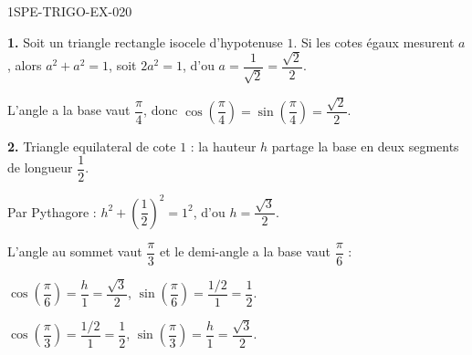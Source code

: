 \begin{corrige}{1SPE-TRIGO-EX-020}

\textbf{1.} Soit un triangle rectangle isocele d'hypotenuse $1$. Si les cotes égaux mesurent $a$, alors $a^2 + a^2 = 1$, soit $2a^2 = 1$, d'ou $a = \dfrac{1}{\sqrt{2}} = \dfrac{\sqrt{2}}{2}$.

L'angle a la base vaut $\dfrac{\pi}{4}$, donc $\cos\!\left(\dfrac{\pi}{4}\right) = \sin\!\left(\dfrac{\pi}{4}\right) = \dfrac{\sqrt{2}}{2}$.

\textbf{2.} Triangle equilateral de cote $1$ : la hauteur $h$ partage la base en deux segments de longueur $\dfrac{1}{2}$.

Par Pythagore : $h^2 + \left(\dfrac{1}{2}\right)^2 = 1^2$, d'ou $h = \dfrac{\sqrt{3}}{2}$.

L'angle au sommet vaut $\dfrac{\pi}{3}$ et le demi-angle a la base vaut $\dfrac{\pi}{6}$ :

$\cos\!\left(\dfrac{\pi}{6}\right) = \dfrac{h}{1} = \dfrac{\sqrt{3}}{2}$, \quad $\sin\!\left(\dfrac{\pi}{6}\right) = \dfrac{1/2}{1} = \dfrac{1}{2}$.

$\cos\!\left(\dfrac{\pi}{3}\right) = \dfrac{1/2}{1} = \dfrac{1}{2}$, \quad $\sin\!\left(\dfrac{\pi}{3}\right) = \dfrac{h}{1} = \dfrac{\sqrt{3}}{2}$.

\end{corrige}
